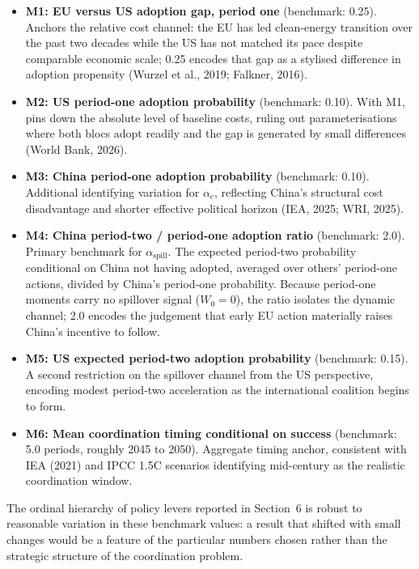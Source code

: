 \documentclass[10pt,a4paper]{article}
\begin{document}
\begin{itemize}[leftmargin=2em]
  \item \textbf{M1: EU versus US adoption gap, period one} (benchmark: 0.25). Anchors the relative cost channel: the EU has led clean-energy transition over the past two decades while the US has not matched its pace despite comparable economic scale; 0.25 encodes that gap as a stylised difference in adoption propensity (Wurzel et al., 2019; Falkner, 2016).

  \item \textbf{M2: US period-one adoption probability} (benchmark: 0.10). With M1, pins down the absolute level of baseline costs, ruling out parameterisations where both blocs adopt readily and the gap is generated by small differences (World Bank, 2026).

  \item \textbf{M3: China period-one adoption probability} (benchmark: 0.10). Additional identifying variation for $\alpha_c$, reflecting China's structural cost disadvantage and shorter effective political horizon (IEA, 2025; WRI, 2025).

  \item \textbf{M4: China period-two / period-one adoption ratio} (benchmark: 2.0). Primary benchmark for $\alpha_{\text{spill}}$. The expected period-two probability conditional on China not having adopted, averaged over others' period-one actions, divided by China's period-one probability. Because period-one moments carry no spillover signal ($W_0 = 0$), the ratio isolates the dynamic channel; 2.0 encodes the judgement that early EU action materially raises China's incentive to follow.

  \item \textbf{M5: US expected period-two adoption probability} (benchmark: 0.15). A second restriction on the spillover channel from the US perspective, encoding modest period-two acceleration as the international coalition begins to form.

  \item \textbf{M6: Mean coordination timing conditional on success} (benchmark: 5.0 periods, roughly 2045 to 2050). Aggregate timing anchor, consistent with IEA (2021) and IPCC 1.5\textdegree C scenarios identifying mid-century as the realistic coordination window.
\end{itemize}

The ordinal hierarchy of policy levers reported in Section~6 is robust to reasonable variation in these benchmark values: a result that shifted with small changes would be a feature of the particular numbers chosen rather than the strategic structure of the coordination problem.
\end{document}
